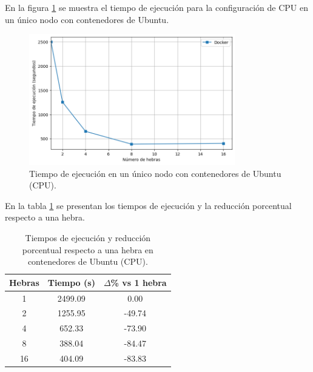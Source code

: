 En la figura \ref{fig:single-node_ubuntu_docker_time} se muestra el tiempo de ejecución para la configuración de CPU en un único nodo con contenedores de Ubuntu.

\begin{figure}[H]
    \centering
    \includegraphics[width=0.8\textwidth]{imagenes/cap5/single-node_ubuntu_docker_time.png}
    \caption{Tiempo de ejecución en un único nodo con contenedores de Ubuntu (CPU).}
    \label{fig:single-node_ubuntu_docker_time}
\end{figure}

En la tabla \ref{tab:single-node_ubuntu_docker} se presentan los tiempos de ejecución y la reducción porcentual respecto a una hebra.

\begin{table}[ht]
    \centering
    \begin{tabular}{|c|c|c|}
        \hline
        \textbf{Hebras} & \textbf{Tiempo (s)} & \textbf{$\Delta$\% vs 1 hebra} \\
        \hline
        1               & 2499.09             & 0.00                           \\
        2               & 1255.95             & -49.74                         \\
        4               & 652.33              & -73.90                         \\
        8               & 388.04              & -84.47                         \\
        16              & 404.09              & -83.83                         \\
        \hline
    \end{tabular}
    \caption{Tiempos de ejecución y reducción porcentual respecto a una hebra en contenedores de Ubuntu (CPU).}
    \label{tab:single-node_ubuntu_docker}
\end{table}


